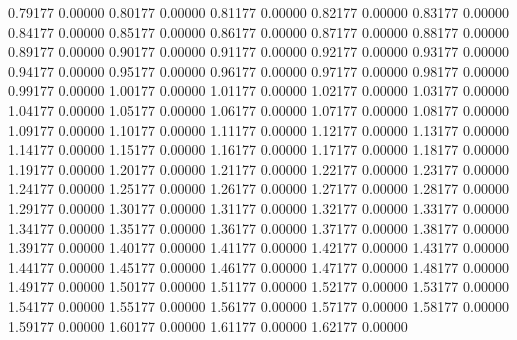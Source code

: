       0.79177      0.00000    
      0.80177      0.00000    
      0.81177      0.00000    
      0.82177      0.00000    
      0.83177      0.00000    
      0.84177      0.00000    
      0.85177      0.00000    
      0.86177      0.00000    
      0.87177      0.00000    
      0.88177      0.00000    
      0.89177      0.00000    
      0.90177      0.00000    
      0.91177      0.00000    
      0.92177      0.00000    
      0.93177      0.00000    
      0.94177      0.00000    
      0.95177      0.00000    
      0.96177      0.00000    
      0.97177      0.00000    
      0.98177      0.00000    
      0.99177      0.00000    
      1.00177      0.00000    
      1.01177      0.00000    
      1.02177      0.00000    
      1.03177      0.00000    
      1.04177      0.00000    
      1.05177      0.00000    
      1.06177      0.00000    
      1.07177      0.00000    
      1.08177      0.00000    
      1.09177      0.00000    
      1.10177      0.00000    
      1.11177      0.00000    
      1.12177      0.00000    
      1.13177      0.00000    
      1.14177      0.00000    
      1.15177      0.00000    
      1.16177      0.00000    
      1.17177      0.00000    
      1.18177      0.00000    
      1.19177      0.00000    
      1.20177      0.00000    
      1.21177      0.00000    
      1.22177      0.00000    
      1.23177      0.00000    
      1.24177      0.00000    
      1.25177      0.00000    
      1.26177      0.00000    
      1.27177      0.00000    
      1.28177      0.00000    
      1.29177      0.00000    
      1.30177      0.00000    
      1.31177      0.00000    
      1.32177      0.00000    
      1.33177      0.00000    
      1.34177      0.00000    
      1.35177      0.00000    
      1.36177      0.00000    
      1.37177      0.00000    
      1.38177      0.00000    
      1.39177      0.00000    
      1.40177      0.00000    
      1.41177      0.00000    
      1.42177      0.00000    
      1.43177      0.00000    
      1.44177      0.00000    
      1.45177      0.00000    
      1.46177      0.00000    
      1.47177      0.00000    
      1.48177      0.00000    
      1.49177      0.00000    
      1.50177      0.00000    
      1.51177      0.00000    
      1.52177      0.00000    
      1.53177      0.00000    
      1.54177      0.00000    
      1.55177      0.00000    
      1.56177      0.00000    
      1.57177      0.00000    
      1.58177      0.00000    
      1.59177      0.00000    
      1.60177      0.00000    
      1.61177      0.00000    
      1.62177      0.00000    
